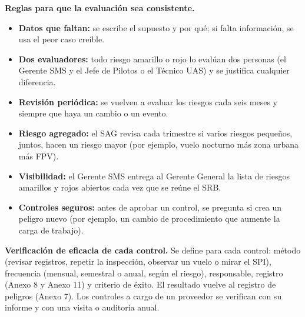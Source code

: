 \textbf{Reglas para que la evaluación sea consistente.}
\begin{itemize}
    \item \textbf{Datos que faltan:} se escribe el supuesto y por qué; si falta información, se usa el peor caso creíble.
    \item \textbf{Dos evaluadores:} todo riesgo amarillo o rojo lo evalúan dos personas (el Gerente SMS y el Jefe de Pilotos o el Técnico UAS) y se justifica cualquier diferencia.
    \item \textbf{Revisión periódica:} se vuelven a evaluar los riesgos cada seis meses y siempre que haya un cambio o un evento.
    \item \textbf{Riesgo agregado:} el SAG revisa cada trimestre si varios riesgos pequeños, juntos, hacen un riesgo mayor (por ejemplo, vuelo nocturno más zona urbana más FPV).
    \item \textbf{Visibilidad:} el Gerente SMS entrega al Gerente General la lista de riesgos amarillos y rojos abiertos cada vez que se reúne el SRB.
    \item \textbf{Controles seguros:} antes de aprobar un control, se pregunta si crea un peligro nuevo (por ejemplo, un cambio de procedimiento que aumente la carga de trabajo).
\end{itemize}

\textbf{Verificación de eficacia de cada control.} Se define para cada control: método (revisar registros, repetir la inspección, observar un vuelo o mirar el SPI), frecuencia (mensual, semestral o anual, según el riesgo), responsable, registro (Anexo 8 y Anexo 11) y criterio de éxito. El resultado vuelve al registro de peligros (Anexo 7). Los controles a cargo de un proveedor se verifican con su informe y con una visita o auditoría anual.

